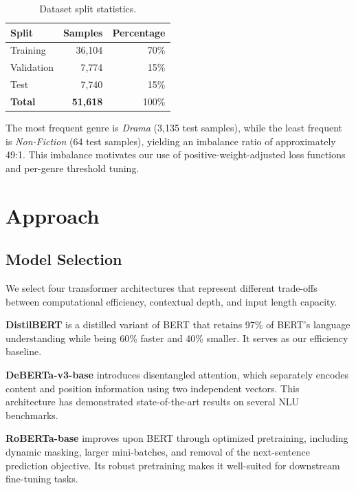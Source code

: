 \documentclass[11pt,a4paper]{article}
\begin{document}
\begin{table}[H]
\centering
\caption{Dataset split statistics.}
\label{tab:splits}
\begin{tabular}{lrr}
\toprule
\textbf{Split} & \textbf{Samples} & \textbf{Percentage} \\
\midrule
Training   & 36,104 & 70\% \\
Validation &  7,774 & 15\% \\
Test       &  7,740 & 15\% \\
\midrule
\textbf{Total} & \textbf{51,618} & 100\% \\
\bottomrule
\end{tabular}
\end{table}

The most frequent genre is \textit{Drama} (3,135 test samples), while the least frequent is \textit{Non-Fiction} (64 test samples), yielding an imbalance ratio of approximately 49:1. This imbalance motivates our use of positive-weight-adjusted loss functions and per-genre threshold tuning.

\section{Approach}

\subsection{Model Selection}

We select four transformer architectures that represent different trade-offs between computational efficiency, contextual depth, and input length capacity.

\textbf{DistilBERT} \cite{sanh2019} is a distilled variant of BERT that retains 97\% of BERT's language understanding while being 60\% faster and 40\% smaller. It serves as our efficiency baseline.

\textbf{DeBERTa-v3-base} \cite{he2021} introduces disentangled attention, which separately encodes content and position information using two independent vectors. This architecture has demonstrated state-of-the-art results on several NLU benchmarks.

\textbf{RoBERTa-base} \cite{liu2019} improves upon BERT through optimized pretraining, including dynamic masking, larger mini-batches, and removal of the next-sentence prediction objective. Its robust pretraining makes it well-suited for downstream fine-tuning tasks.
\end{document}
